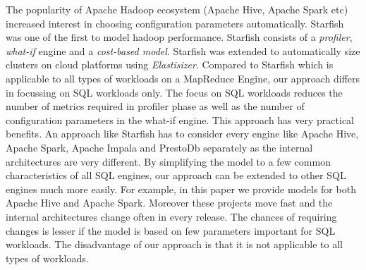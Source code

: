 The popularity of Apache Hadoop ecosystem (Apache Hive, Apache Spark etc) increased interest
in choosing configuration parameters automatically. 
Starfish \cite{herodotou2011starfish} was one of the first to model hadoop performance. Starfish 
consists of a \textit{profiler}, \textit{what-if} engine and a \textit{cost-based model}\cite{herodotou2011profiling}. 
Starfish was extended to automatically size clusters on cloud platforms using \textit{Elastisizer}\cite{HerodotouNoOne}.
Compared to Starfish which is applicable to all types of workloads on a MapReduce Engine, our approach differs in focussing on SQL workloads only. The focus on 
SQL workloads reduces the number of metrics required in profiler phase as well as the number of configuration parameters in the what-if engine.
This approach has very practical benefits. An approach like Starfish has to consider every engine like Apache Hive, Apache Spark, Apache Impala and PrestoDb separately
as the internal architectures are very different. By simplifying the model to a few common characteristics of all SQL engines, our approach can be extended
to other SQL engines much more easily. For example, in this paper we provide models for both Apache Hive and Apache Spark. Moreover these projects move 
fast and the internal architectures change often in every release. The chances of requiring changes is lesser if the model is based on few parameters important for SQL workloads.
The disadvantage of our approach is that it is not applicable to all types of workloads. 


